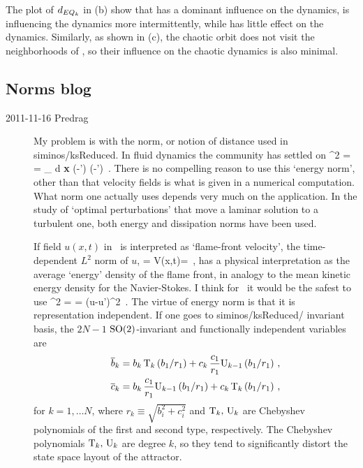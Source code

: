 The plot of $d_{EQ_{k}}$ in (b) show that  has a dominant
influence on the dynamics,  is influencing the dynamics more intermittently, while
 has little effect on the dynamics.  Similarly, as shown in (c),
the chaotic orbit does not visit the neighborhoods of \reqva , so their influence on
the chaotic dynamics is also minimal.

\subsection{Norms blog}

\begin{description}
\item[2011-11-16 Predrag] My problem is with the norm, or notion of
distance used in siminos/ksReduced. In fluid dynamics the community has
settled on
\beq
  ^2  =  =
\int_\Omega \! d {\bf x} \;
(-') \cdot (-')
\,.
\label{innerproduct} \eeq
There is no compelling reason to use this {`energy norm'}, other than
that velocity fields is what is given in a numerical computation. What
norm one actually uses depends very much on the application. In the study
of `optimal perturbations' that move a laminar solution to a turbulent
one, both energy \citep{TeHaHe10} and dissipation \citep{LoCaCoPeGo11}
norms have been used.

If field $u(x,t)$ in \KSe\  is interpreted as
`flame-front velocity', the time-dependent $L^2$ norm
of $u$,
\beq
  \expctE= \Lint{\pSpace} V(x,t)= \Lint{\pSpace} 
  \,,
  \label{ksEnergyFreeze}
\eeq
has a physical interpretation as the average `energy'
density of the flame front, in analogy to the mean kinetic energy
density for the Navier-Stokes.
I think for \KS\ it would be the safest to use
\beq
  ^2  =  =
\Lint{\pSpace} ({u}-{u}')^2
\,.
\label{KSnormFr} \eeq
The virtue of energy norm is that it is representation independent. If
one goes to siminos/ksReduced/ invariant basis, the $2N-1$
$\textrm{SO}(2)$-invariant and functionally independent variables are
\bseq\label{eq:SO2cheb}
  \begin{align}
    \overline{b}_k &=
		    b_k\, \mathrm{T}_k\left(b_1/r_1\right)+
		    c_k\,\frac{c_1}{r_1} \mathrm{U}_{k-1}\left(b_1/r_1\right)\,, \label{eq:SO2cheb1}\\
    \overline{c}_k &=
		    b_k\, \frac{c_1}{r_1} \mathrm{U}_{k-1}\left(b_1/r_1\right)+
		    c_k\,\mathrm{T}_k\left(b_1/r_1\right)\,,  \label{eq:SO2cheb2}
  \end{align}
\eseq
for $k=1,\ldots N$, where $r_k\equiv\sqrt{b_i^2+c_i^2}$ and $\mathrm{T}_k,\,\mathrm{U}_k$
are Chebyshev polynomials of the first and second type, respectively.
The Chebyshev polynomials $\mathrm{T}_k,\,\mathrm{U}_k$ are degree $k$, so they tend
to significantly distort the state space layout of the attractor.


\end{description}
